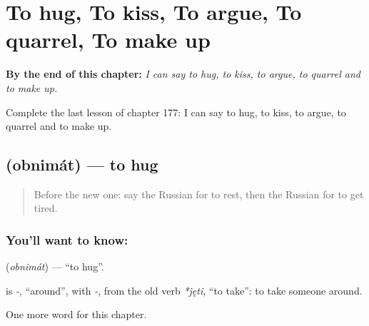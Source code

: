 
\chapter{To hug, To kiss, To argue, To quarrel, To make up}
\label{ch:ru-to-hug-to-kiss-to-argue-to-quarrel-to-make-up}

\begin{chapteropening}
\textbf{By the end of this chapter:} \emph{I can say to hug, to kiss, to argue, to quarrel and to make up.}

Complete the last lesson of chapter 177: I can say to hug, to kiss, to argue, to quarrel and to make up.
\end{chapteropening}

\section[\texorpdfstring{\ru{обнимать} (obnimát)}{обнимать (obnimát)}]{ (obnimát) — to hug}

\label{lesson:RU-C177-obnimat}



\begin{quote}
Before the new one: say the Russian for to rest, then the Russian for to get tired.
\end{quote}

\subsection*{You'll want to know: }
\textbf{} (\emph{obnimát}) — \textquotedblleft{}to hug\textquotedblright{}.

\begin{cousinweb}
\textbf{} is \emph{-}, \textquotedblleft{}around\textquotedblright{}, with \emph{-}, from the old verb \emph{*jęti}, \textquotedblleft{}to take\textquotedblright{}: to take someone around.
\end{cousinweb}

\begin{grammarlens}[title={What you've built}]
One more word for this chapter.
\end{grammarlens}

